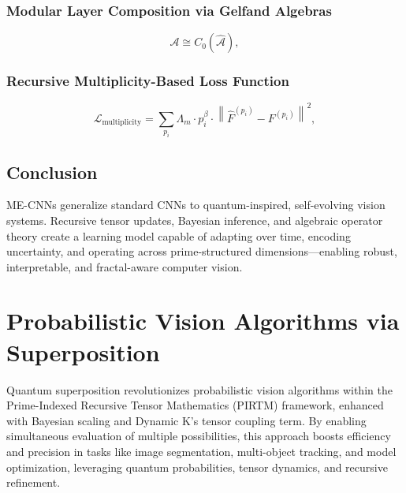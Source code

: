 \documentclass{article}
\theoremstyle{plain}
\begin{document}
\subsubsection{Modular Layer Composition via Gelfand Algebras}
\begin{equation}
\mathcal{A} \cong C_0(\hat{\mathcal{A}}),
\end{equation}

\subsubsection{Recursive Multiplicity-Based Loss Function}
\begin{equation}
\mathcal{L}_{\text{multiplicity}} = \sum_{p_i} \Lambda_m \cdot p_i^{\beta} \cdot \left\| \hat{F}^{(p_i)} - F^{(p_i)} \right\|^2,
\end{equation}

\subsection{Conclusion}
ME-CNNs generalize standard CNNs to quantum-inspired, self-evolving vision systems. Recursive tensor updates, Bayesian inference, and algebraic operator theory create a learning model capable of adapting over time, encoding uncertainty, and operating across prime-structured dimensions—enabling robust, interpretable, and fractal-aware computer vision.
\section{Probabilistic Vision Algorithms via Superposition}
Quantum superposition revolutionizes probabilistic vision algorithms within the Prime-Indexed Recursive Tensor Mathematics (PIRTM) framework, enhanced with Bayesian scaling and Dynamic K’s tensor coupling term. By enabling simultaneous evaluation of multiple possibilities, this approach boosts efficiency and precision in tasks like image segmentation, multi-object tracking, and model optimization, leveraging quantum probabilities, tensor dynamics, and recursive refinement.
\end{document}
